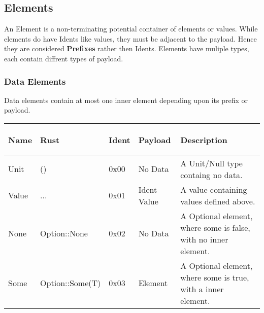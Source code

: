 \documentclass{report}
\begin{document}
\subsection{Elements}
An Element is a non-terminating potential container of elements or values. While elements do have Idents like values,
they must be adjacent to the payload. Hence they are considered \textbf{Prefixes} rather then Idents.
Elements have muliple types, each contain diffrent types of payload.


\subsubsection{Data Elements}
Data elements contain at most one inner element depending upon its prefix or payload.

\begin{adjustwidth}{-1.5cm}{}
\begin{tabular}{| m{5.5em} | m{4.5em} | m{5em} | m{7em} | m{12em} |}
\hline
\begin{center} \textbf{Name} \end{center} &
 \begin{center} \textbf{Rust} \end{center} &
  \begin{center} \textbf{Ident} \end{center} &
   \begin{center} \textbf{Payload} \end{center} &
    \begin{center} \textbf{Description} \end{center} \\
\hline

Unit & () & 0x00 & No Data & A Unit/Null type containg no data. \\
Value & ... & 0x01 & Ident Value & A value containing values defined above. \\
None & \tiny Option::None & 0x02 & No Data & A Optional element, where some is false, with no inner element. \\
Some & \tiny Option::Some(T) & 0x03 & Element & A Optional element, where some is true, with a inner element. \\


\end{tabular}
\end{adjustwidth}
\end{document}
